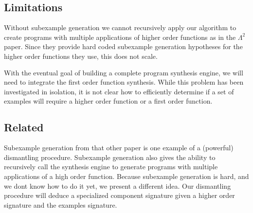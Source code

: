 \subsection{Limitations}

Without subexample generation we cannot recursively apply our algorithm to create programs with multiple applications of higher order functions as in the   $\Lambda^2$ paper\cite{isil}. Since they provide hard coded subexample generation hypotheses for the higher order functions they use, this does not scale.

With the eventual goal of building a complete program synthesis engine, we will need to integrate the first order function synthesis. While this problem has been investigated in isolation, it is not clear how to efficiently determine if  a set of examples will require a higher order function or a first order function.


\subsection{Related}
Subexample generation from that other paper\cite{isil} is one example of a (powerful) dismantling procedure.
Subexample generation also gives the ability to recursively call the synthesis engine to generate programs with multiple applications of a high order function.
Because subexample generation is hard, and we dont know how to do it yet, we present a different idea.
Our dismantling procedure will deduce a specialized component signature given a higher order signature and the examples signature.